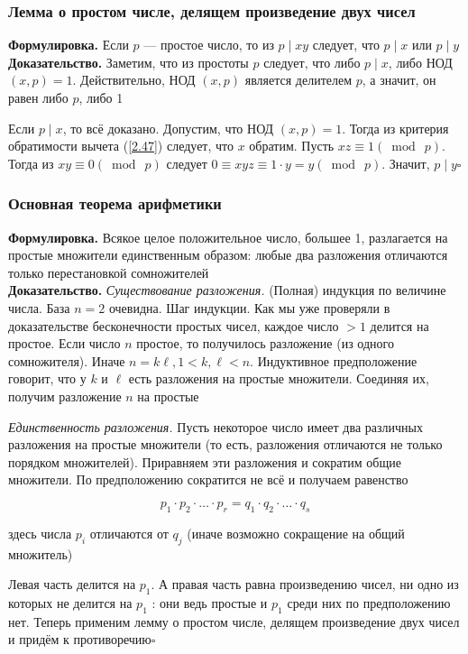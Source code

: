 \documentclass[a4paper]{article}
\newcommand{\qed}{\hfill$\square$}
\begin{document}
\subsubsection*{Лемма о простом числе, делящем произведение двух чисел}
\textbf{Формулировка.} Если $p$ — простое число, то из $p \mid xy$ следует, что $p \mid x$ или $p \mid y$\\[2mm]
\indent\textbf{Доказательство.} Заметим, что из простоты $p$ следует, что либо $p \mid x$, либо НОД $(x, p)=1$. Действительно, НОД $(x, p)$ является делителем $p$, а значит, он равен либо $p$, либо 1

Если $p \mid x$, то всё доказано. Допустим, что НОД $(x, p)=1$. Тогда из критерия обратимости вычета (\ref{2.47}) следует, что $x$ обратим. Пусть $x z \equiv 1(\bmod\ p)$. Тогда из $x y \equiv 0(\bmod\ p)$ следует $0 \equiv x y z \equiv 1 \cdot y=y(\bmod\ p)$. Значит, $p \mid y$\qed


\subsubsection*{Основная теорема арифметики}
\textbf{Формулировка.} Всякое целое положительное число, большее 1, разлагается на простые множители единственным образом: любые два разложения отличаются только перестановкой сомножителей\\[2mm]
\indent\textbf{Доказательство.} \textit{Существование разложения.} (Полная) индукция по величине числа. База $n=2$ очевидна. Шаг индукции. Как мы уже проверяли в доказательстве бесконечности простых чисел, каждое число $>1$ делится на простое. Если число $n$ простое, то получилось разложение (из одного сомножителя). Иначе $n=k \ell, 1<k, \ell<n$. Индуктивное предположение говорит, что у $k$ и $\ell$ есть разложения на простые множители. Соединяя их, получим разложение $n$ на простые

\textit{Единственность разложения.} Пусть некоторое число имеет два различных разложения на простые множители (то есть, разложения отличаются не только порядком множителей). Приравняем эти разложения и сократим общие множители. По предположению сократится не всё и получаем равенство

$$
p_{1} \cdot p_{2} \cdot \ldots \cdot p_{r}=q_{1} \cdot q_{2} \cdot \ldots \cdot q_{s}
$$

здесь числа $p_{i}$ отличаются от $q_{j}$ (иначе возможно сокращение на общий множитель)

Левая часть делится на $p_{1}$. А правая часть равна произведению чисел, ни одно из которых не делится на $p_{1}$ : они ведь простые и $p_{1}$ среди них по предположению нет. Теперь применим лемму о простом числе, делящем произведение двух чисел и придём к противоречию\qed
\end{document}
